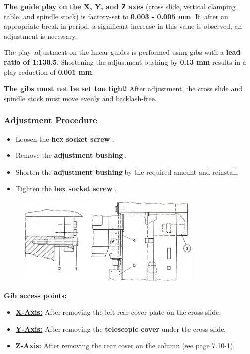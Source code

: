 \textbf{The guide play on the X, Y, and Z axes} (cross slide, vertical clamping table, and spindle stock) is factory-set to \textbf{0.003 - 0.005 mm}.  
If, after an appropriate break-in period, a significant increase in this value is observed, an adjustment is necessary.

The play adjustment on the linear guides is performed using gibs with a \textbf{lead ratio of 1:130.5}.  
Shortening the adjustment bushing by \textbf{0.13 mm} results in a play reduction of \textbf{0.001 mm}\footnotemark[1].

\textbf{The gibs must not be set too tight!}  
After adjustment, the cross slide and spindle stock must move evenly and backlash-free.

\subsubsection*{Adjustment Procedure}
\begin{itemize}
    \item Loosen the \textbf{hex socket screw} .
    \item Remove the \textbf{adjustment bushing} .
    \item Shorten the \textbf{adjustment bushing}  by the required amount and reinstall.
    \item Tighten the \textbf{hex socket screw} .
\end{itemize}

\begin{figure}[H]
    \centering
    \includegraphics[width=0.8\textwidth]{images/chapter7/gib_adjustment_diagram.jpg}
    \label{fig:gib_adjustment}
\end{figure}

\textbf{Gib access points:}
\begin{itemize}
    \item \textbf{\underline{X-Axis:}} After removing the left rear cover plate  on the cross slide.
    \item \textbf{\underline{Y-Axis:}} After removing the \textbf{telescopic cover}  under the cross slide.
    \item \textbf{\underline{Z-Axis:}} After removing the rear cover  on the column (see page 7.10-1).
\end{itemize}

